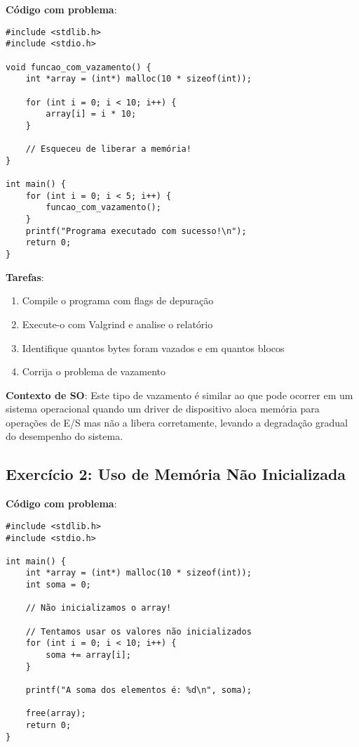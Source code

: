 \documentclass[11pt,a4paper]{article}
\begin{document}
\textbf{Código com problema}:

\begin{lstlisting}
#include <stdlib.h>
#include <stdio.h>

void funcao_com_vazamento() {
    int *array = (int*) malloc(10 * sizeof(int));
    
    for (int i = 0; i < 10; i++) {
        array[i] = i * 10;
    }
    
    // Esqueceu de liberar a memória!
}

int main() {
    for (int i = 0; i < 5; i++) {
        funcao_com_vazamento();
    }
    printf("Programa executado com sucesso!\n");
    return 0;
}
\end{lstlisting}

\textbf{Tarefas}:
\begin{enumerate}
    \item Compile o programa com flags de depuração
    \item Execute-o com Valgrind e analise o relatório
    \item Identifique quantos bytes foram vazados e em quantos blocos
    \item Corrija o problema de vazamento
\end{enumerate}

\textbf{Contexto de SO}: Este tipo de vazamento é similar ao que pode ocorrer em um sistema operacional quando um driver de dispositivo aloca memória para operações de E/S mas não a libera corretamente, levando a degradação gradual do desempenho do sistema.

\subsection{Exercício 2: Uso de Memória Não Inicializada}

\textbf{Código com problema}:

\begin{lstlisting}
#include <stdlib.h>
#include <stdio.h>

int main() {
    int *array = (int*) malloc(10 * sizeof(int));
    int soma = 0;
    
    // Não inicializamos o array!
    
    // Tentamos usar os valores não inicializados
    for (int i = 0; i < 10; i++) {
        soma += array[i];
    }
    
    printf("A soma dos elementos é: %d\n", soma);
    
    free(array);
    return 0;
}
\end{lstlisting}
\end{document}
